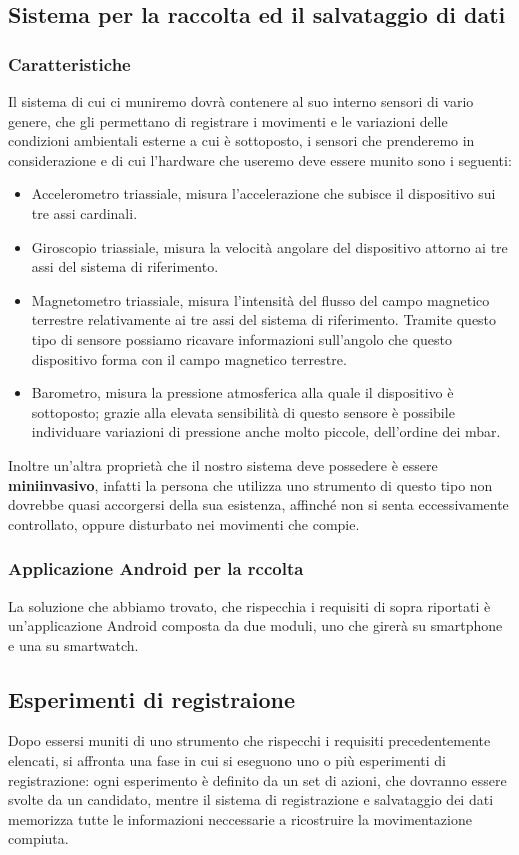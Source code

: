 \documentclass[a4paper]{article}
\begin{document}
	\subsection{Sistema per la raccolta ed il salvataggio di dati}


	\subsubsection{Caratteristiche}
Il sistema di cui ci muniremo dovrà contenere al suo interno sensori di vario genere, che gli permettano di registrare i movimenti e le variazioni delle condizioni ambientali esterne a cui è sottoposto, i sensori che prenderemo in considerazione e di cui l'hardware che useremo deve essere munito sono i seguenti:
\begin{itemize}
\item Accelerometro triassiale, misura l’accelerazione che subisce il dispositivo sui tre assi cardinali.
\item Giroscopio triassiale, misura la velocità angolare del dispositivo attorno ai tre assi del sistema di riferimento.
\item Magnetometro triassiale, misura l’intensità del flusso del campo magnetico terrestre relativamente ai tre assi del sistema di riferimento. Tramite questo tipo di sensore possiamo ricavare informazioni sull’angolo che questo dispositivo forma con il campo magnetico terrestre.
\item Barometro, misura la pressione atmosferica alla quale il dispositivo è sottoposto; grazie alla elevata sensibilità di questo sensore è possibile individuare variazioni di pressione anche molto piccole, dell’ordine dei mbar.
\end{itemize}
Inoltre un'altra proprietà che il nostro sistema deve possedere è essere \textbf{miniinvasivo}, infatti la persona che utilizza uno strumento di questo tipo non dovrebbe quasi accorgersi della sua esistenza, affinché non si senta eccessivamente controllato, oppure disturbato nei movimenti che compie.

	\subsubsection{Applicazione Android per la rccolta}
La soluzione che abbiamo trovato, che rispecchia i requisiti di sopra riportati è un'applicazione Android composta da due moduli, uno che girerà su smartphone e una su smartwatch.

	\subsection{Esperimenti di registraione}
Dopo essersi muniti di uno strumento che rispecchi i requisiti precedentemente elencati, si  affronta una fase in cui si eseguono uno o più esperimenti di registrazione: ogni esperimento è definito da un set di azioni, che dovranno essere svolte da un candidato, mentre il sistema di registrazione e salvataggio dei dati memorizza tutte le informazioni neccessarie a ricostruire la movimentazione compiuta.
\end{document}
